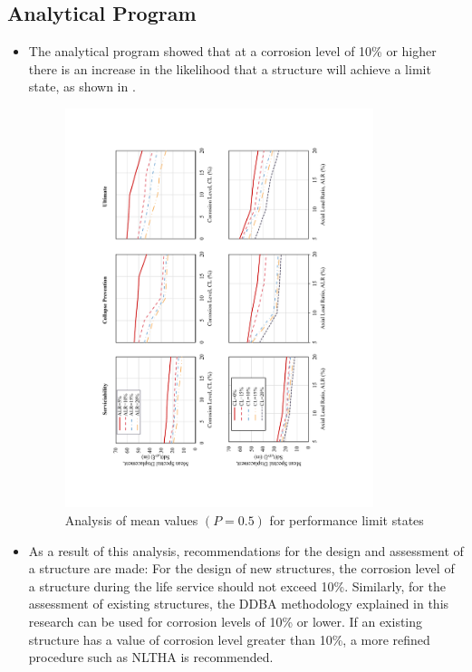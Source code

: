 \subsection{Analytical Program}
\begin{itemize}
    \item The analytical program showed that at a corrosion level of 10\% or higher there is an increase in the likelihood that a structure will achieve a limit state, as shown in .
    
    \begin{figure}[htbp]
	\centering
	\includegraphics[width=0.85\textwidth]{VAC Thesis 2.0/Chapter-5/figs/Analysis_of_Mean_SDs.pdf}
	\caption{Analysis of mean values $(P=0.5)$ for performance limit states}
	\label{fig:mean_prob_vs_CL_ch7}
    \end{figure}
    
    \item As a result of this analysis, recommendations for the design and assessment of a structure are made: For the design of new structures, the corrosion level of a structure during the life service should not exceed 10\%. Similarly, for the assessment of existing structures, the DDBA methodology explained in this research can be used for corrosion levels of 10\% or lower. If an existing structure has a value of corrosion level greater than 10\%, a more refined procedure such as NLTHA is recommended.
\end{itemize}


